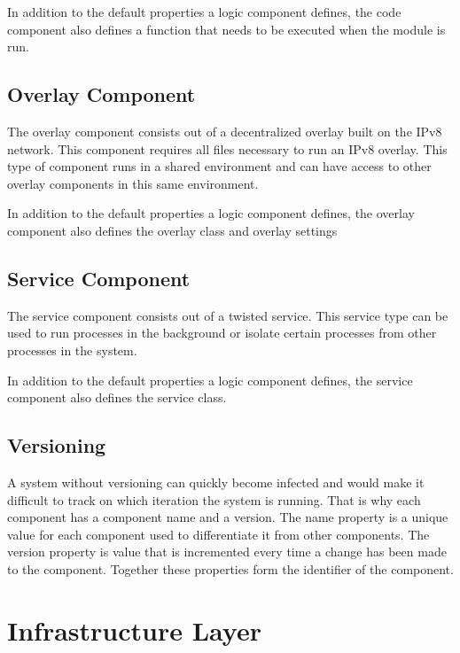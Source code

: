 In addition to the default properties a logic component defines, the code component also defines a function that needs to be executed when the module is run.

\subsection{Overlay Component}

The overlay component consists out of a decentralized overlay built on the IPv8 network. This component requires all files necessary to run an IPv8 overlay. This type of component runs in a shared environment and can have access to other overlay components in this same environment.

In addition to the default properties a logic component defines, the overlay component also defines the overlay class and overlay settings


\subsection{Service Component}

The service component consists out of a twisted service. This service type can be used to run processes in the background or isolate certain processes from other processes in the system.

In addition to the default properties a logic component defines, the service component also defines the service class.


\subsection{Versioning}

A system without versioning can quickly become infected and would make it difficult to track on which iteration the system is running. That is why each component has a component name and a version. The name property is a unique value for each component used to differentiate it from other components. The version property is value that is incremented every time a change has been made to the component. Together these properties form the identifier of the component.

\section{Infrastructure Layer}

